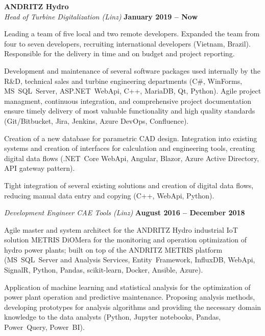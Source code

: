 \documentclass[line,11pt,a4paper]{resume}
\begin{document}
\begin{resume}
\textbf{ANDRITZ Hydro}\\\vspace{1mm}%
\textsl{Head of Turbine Digitalization (Linz)}
  \hfill \textbf{January 2019 -- Now}\\
\vspace{-4mm}%
\begin{list2}
  \item Leading a team of five local and two remote developers. Expanded the
    team from four to seven developers, recruiting international developers
    (Vietnam, Brazil). Responsible for the delivery in time and on budget and
    project reporting.
  \item Development and maintenance of several software packages used
    internally by the R\&D, technical sales and turbine engineering
    departments (C\#, WinForms, MS~SQL~Server, ASP.NET~WebApi, C++, MariaDB,
    Qt, Python). Agile project managment, continuous integration, and
    comprehensive project documentation ensure timely delivery of most valuable
    functionality and high quality standards (Git/Bitbucket, Jira, Jenkins,
    Azure DevOps, Confluence).
  \item Creation of a new database for parametric CAD design. Integration into
    existing systems and creation of interfaces for calculation and engineering
    tools, creating digital data flows (.NET~Core WebApi, Angular, Blazor,
    Azure Active Directory, API gateway pattern).
  \item Tight integration of several existing solutions and creation of digital
    data flows, reducing manual data entry and copying (C++, WebApi, Python).
\end{list2}

\textsl{Development Engineer CAE Tools (Linz)}
  \hfill \textbf{August 2016 -- December 2018}\\
\vspace{-4mm}%
\begin{list2}
  \item Agile master and system architect for the ANDRITZ Hydro industrial IoT
    solution METRIS DiOMera for the monitoring and operation optimization of
    hydro power plants; built on top of the ANDRITZ METRIS platform
    (MS~SQL~Server and Analysis Services, Entity~Framework, InfluxDB, WebApi,
    SignalR, Python, Pandas, scikit-learn, Docker, Ansible, Azure).
  \item Application of machine learning and statistical analysis for the
    optimization of power plant operation and predictive maintenance.
    Proposing analysis methods, developing prototypes for analysis algorithms
    and providing the necessary domain knowledge to the data analysts (Python,
    Jupyter notebooks, Pandas, Power~Query, Power~BI).
\end{list2}


\end{resume}
\end{document}
